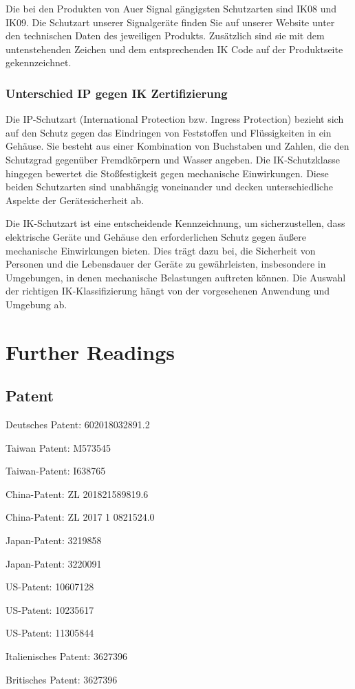 Die bei den Produkten von Auer Signal gängigsten Schutzarten sind IK08 und IK09. Die Schutzart unserer Signalgeräte finden Sie auf unserer Website unter den technischen Daten des jeweiligen Produkts. Zusätzlich sind sie mit dem untenstehenden Zeichen und dem entsprechenden IK Code auf der Produktseite gekennzeichnet.\cite{Auer:2026} %

\subsubsection{Unterschied IP gegen IK Zertifizierung}

Die IP-Schutzart (International Protection bzw. Ingress Protection) bezieht sich auf den Schutz gegen das Eindringen von Feststoffen und Flüssigkeiten in ein Gehäuse. Sie besteht aus einer Kombination von Buchstaben und Zahlen, die den Schutzgrad gegenüber Fremdkörpern und Wasser angeben. Die IK-Schutzklasse hingegen bewertet die Stoßfestigkeit gegen mechanische Einwirkungen. Diese beiden Schutzarten sind unabhängig voneinander und decken unterschiedliche Aspekte der Gerätesicherheit ab.

Die IK-Schutzart ist eine entscheidende Kennzeichnung, um sicherzustellen, dass elektrische Geräte und Gehäuse den erforderlichen Schutz gegen äußere mechanische Einwirkungen bieten. Dies trägt dazu bei, die Sicherheit von Personen und die Lebensdauer der Geräte zu gewährleisten, insbesondere in Umgebungen, in denen mechanische Belastungen auftreten können. Die Auswahl der richtigen IK-Klassifizierung hängt von der vorgesehenen Anwendung und Umgebung ab. \cite{Auer:2026}

\section{Further Readings}

\subsection{Patent}
\label{Patent}
\begin{itemize}{
		\item Deutsches Patent:		602018032891.2
		\item Taiwan Patent: 		M573545
		\item Taiwan-Patent:		I638765
		\item China-Patent:			ZL 201821589819.6
		\item China-Patent:			ZL 2017 1 0821524.0
		\item Japan-Patent:			3219858
		\item Japan-Patent:			3220091
		\item US-Patent:			10607128
		\item US-Patent:			10235617
		\item US-Patent:			11305844
		\item Italienisches Patent:	3627396
		\item Britisches Patent:	3627396
		
}\end{itemize}
\cite{yoke:2025}
